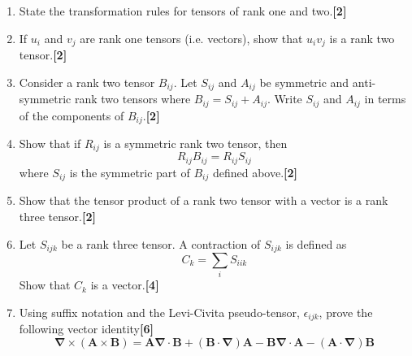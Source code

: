 \documentclass[a4paper]{article}
\begin{document}
\begin{qns}[Tensors]\leavevmode
\begin{enumerate}[label=(\roman*)]
\item State the transformation rules for tensors of rank one and two.\hfill\textbf{[2]}
\item If $u_i$ and $v_j$ are rank one tensors (i.e. vectors), show that $u_iv_j$ is a rank two tensor.\hfill\textbf{[2]}
\item Consider a rank two tensor $B_{ij}$. Let $S_{ij}$ and $A_{ij}$ be symmetric and anti-symmetric rank two tensors where $B_{ij} = S_{ij}+A_{ij}$. Write $S_{ij}$ and $A_{ij}$ in terms of the components of $B_{ij}$.\hfill\textbf{[2]}
\item Show that if $R_{ij}$ is a symmetric rank two tensor, then 
$$R_{ij}B_{ij}=R_{ij}S_{ij}$$
where $S_{ij}$ is the symmetric part of $B_{ij}$ defined above.\hfill\textbf{[2]}
\item Show that the tensor product of a rank two tensor with a vector is a rank three
tensor.\hfill\textbf{[2]}
\item Let $S_{ijk}$ be a rank three tensor. A contraction of $S_{ijk}$ is defined as
$$C_k=\sum_i S_{iik}$$
Show that $C_k$ is a vector.\hfill\textbf{[4]}
\item Using suffix notation and the Levi-Civita pseudo-tensor, $\epsilon_{ijk}$, prove the following vector identity\hfill\textbf{[6]}
$$\boldsymbol{\nabla}\times(\mathbf{A}\times\mathbf{B})=\mathbf{A}\boldsymbol{\nabla}\cdot\mathbf{B}+(\mathbf{B}\cdot\boldsymbol{\nabla})\mathbf{A}-\mathbf{B}\boldsymbol{\nabla}\cdot\mathbf{A}-(\mathbf{A}\cdot\boldsymbol{\nabla})\mathbf{B}$$
\end{enumerate}
\end{qns}
\end{document}

